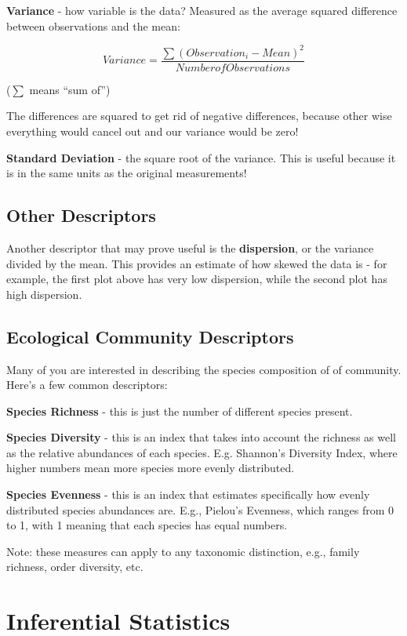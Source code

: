 \documentclass[
  letterpaper,
  DIV=11,
  numbers=noendperiod]{scrreprt}
\begin{document}
\textbf{Variance} - how variable is the data? Measured as the average
squared difference between observations and the mean:

\[
Variance = \frac{\sum (Observation_i - Mean)^2}{Number of Observations}
\]

(\(\sum\) means ``sum of'')

The differences are squared to get rid of negative differences, because
other wise everything would cancel out and our variance would be zero!

\textbf{Standard Deviation} - the square root of the variance. This is
useful because it is in the same units as the original measurements!

\section{Other Descriptors}\label{other-descriptors}

Another descriptor that may prove useful is the \textbf{dispersion}, or
the variance divided by the mean. This provides an estimate of how
skewed the data is - for example, the first plot above has very low
dispersion, while the second plot has high dispersion.

\section{Ecological Community
Descriptors}\label{ecological-community-descriptors}

Many of you are interested in describing the species composition of of
community. Here's a few common descriptors:

\textbf{Species Richness} - this is just the number of different species
present.

\textbf{Species Diversity} - this is an index that takes into account
the richness as well as the relative abundances of each species. E.g.
Shannon's Diversity Index, where higher numbers mean more species more
evenly distributed.

\textbf{Species Evenness} - this is an index that estimates specifically
how evenly distributed species abundances are. E.g., Pielou's Evenness,
which ranges from 0 to 1, with 1 meaning that each species has equal
numbers.

Note: these measures can apply to any taxonomic distinction, e.g.,
family richness, order diversity, etc.

\chapter{Inferential Statistics}\label{inferential-statistics}
\end{document}

